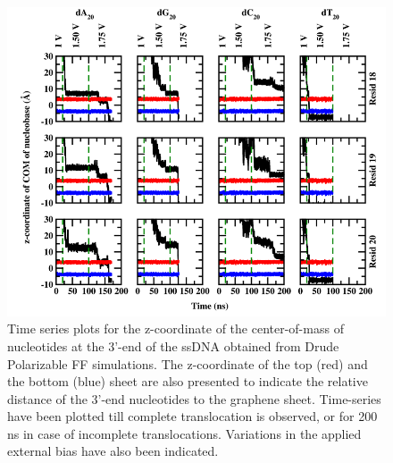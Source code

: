 \begin{figure}
    \centering
    \includegraphics[width=\textwidth]{Appendix/Figures/D2_port.png}
    \caption[Time series plots for the z-coordinate of the center-of-mass of nucleotides at the 3’-end of the ssDNA obtained from Drude Polarizable FF simulations]{Time series plots for the z-coordinate of the center-of-mass of nucleotides at the 3’-end of the ssDNA obtained from Drude Polarizable FF simulations. The z-coordinate of the top (red) and the bottom (blue) sheet are also presented to indicate the relative distance of the 3’-end nucleotides to the graphene sheet. Time-series have been plotted till complete translocation is observed, or for 200 ns in case of incomplete translocations. Variations in the applied external bias have also been indicated.}
\end{figure}